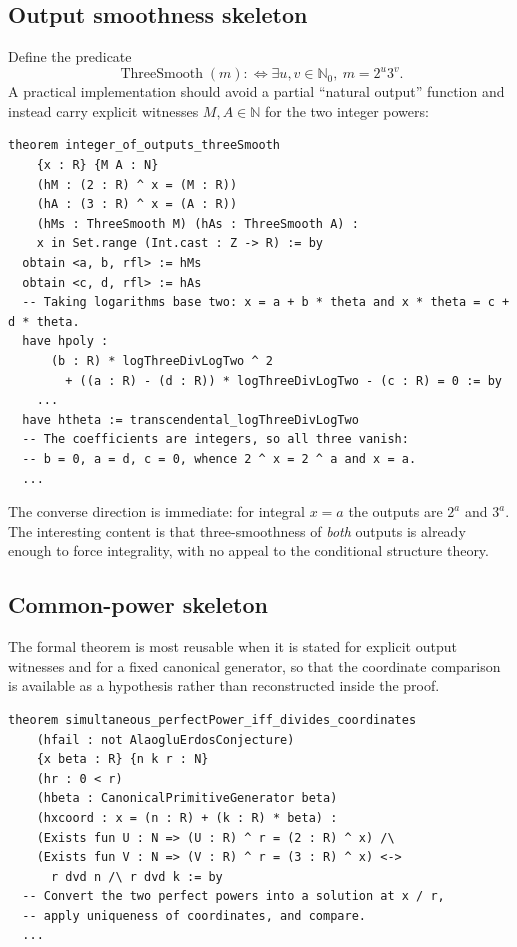 \documentclass[11pt,oneside]{article}
\theoremstyle{definition}
\theoremstyle{remark}
\newcommand{\N}{\mathbb N}
\newcommand{\Nzero}{\mathbb N_0}
\begin{document}
\subsection{Output smoothness skeleton}
\label{a3:smooth-skeleton}

Define the predicate
\[
  \operatorname{ThreeSmooth}(m)
  :\Longleftrightarrow
  \exists u,v\in\Nzero,\ m=2^{u}3^{v}.
\]
A practical implementation should avoid a partial ``natural output'' function and instead
carry explicit witnesses $M,A\in\N$ for the two integer powers:

\begin{lstlisting}[style=leanstyle,caption={Output smoothness: skeleton.},label={a3:lst-smooth}]
theorem integer_of_outputs_threeSmooth
    {x : R} {M A : N}
    (hM : (2 : R) ^ x = (M : R))
    (hA : (3 : R) ^ x = (A : R))
    (hMs : ThreeSmooth M) (hAs : ThreeSmooth A) :
    x in Set.range (Int.cast : Z -> R) := by
  obtain <a, b, rfl> := hMs
  obtain <c, d, rfl> := hAs
  -- Taking logarithms base two: x = a + b * theta and x * theta = c + d * theta.
  have hpoly :
      (b : R) * logThreeDivLogTwo ^ 2
        + ((a : R) - (d : R)) * logThreeDivLogTwo - (c : R) = 0 := by
    ...
  have htheta := transcendental_logThreeDivLogTwo
  -- The coefficients are integers, so all three vanish:
  -- b = 0, a = d, c = 0, whence 2 ^ x = 2 ^ a and x = a.
  ...
\end{lstlisting}

The converse direction is immediate: for integral $x=a$ the outputs are $2^{a}$ and $3^{a}$.
The interesting content is that three-smoothness of \emph{both} outputs is already enough to
force integrality, with no appeal to the conditional structure theory.

\subsection{Common-power skeleton}
\label{a3:power-skeleton}

The formal theorem is most reusable when it is stated for explicit output witnesses and for a
fixed canonical generator, so that the coordinate comparison is available as a hypothesis
rather than reconstructed inside the proof.

\begin{lstlisting}[style=leanstyle,caption={Common powers: skeleton.},label={a3:lst-power}]
theorem simultaneous_perfectPower_iff_divides_coordinates
    (hfail : not AlaogluErdosConjecture)
    {x beta : R} {n k r : N}
    (hr : 0 < r)
    (hbeta : CanonicalPrimitiveGenerator beta)
    (hxcoord : x = (n : R) + (k : R) * beta) :
    (Exists fun U : N => (U : R) ^ r = (2 : R) ^ x) /\
    (Exists fun V : N => (V : R) ^ r = (3 : R) ^ x) <->
      r dvd n /\ r dvd k := by
  -- Convert the two perfect powers into a solution at x / r,
  -- apply uniqueness of coordinates, and compare.
  ...
\end{lstlisting}
\end{document}
